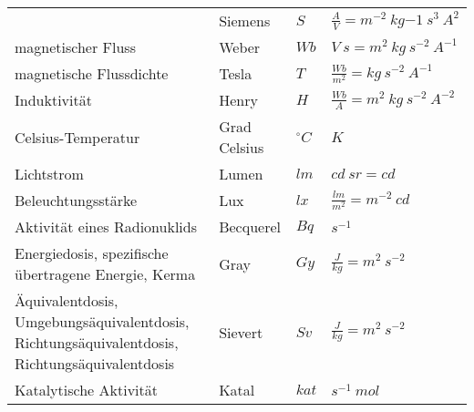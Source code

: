 \begin{footnotesize}
\begin{longtable}{p{}lll}
                    & Siemens
                    & $S$
                    & $\frac{A}{V} = m^{-2}~kg{-1}~s^3~A^2$ \\
  \rowcolor{lgray}  magnetischer Fluss
                    & Weber
                    & $Wb$
                    & $V~s = m^2~kg~s^{-2}~A^{-1}$ \\
  \rowcolor{white}  magnetische Flussdichte
                    & Tesla
                    & $T$
                    & $\frac{Wb}{m^2} = kg~s^{-2}~A^{-1}$ \\
  \rowcolor{lgray}  Induktivität
                    & Henry
                    & $H$
                    & $\frac{Wb}{A} = m^2~kg~s^{-2}~A^{-2}$ \\
  \rowcolor{white}  Celsius-Temperatur
                    & Grad Celsius
                    & $^{\circ} C$
                    & $K$ \\
  \rowcolor{lgray}  Lichtstrom
                    & Lumen
                    & $lm$
                    & $cd~sr = cd$ \\
  \rowcolor{white}  Beleuchtungsstärke
                    & Lux
                    & $lx$
                    & $\frac{lm}{m^2} = m^{-2}~cd$ \\
  \rowcolor{lgray}  Aktivität eines Radionuklids
                    & Becquerel
                    & $Bq$
                    & $s^{-1}$ \\
  \rowcolor{white}  Energiedosis, spezifische übertragene Energie, Kerma
                    & Gray
                    & $Gy$
                    & $\frac{J}{kg} = m^2~s^{-2}$ \\
  \rowcolor{lgray}  Äquivalentdosis, Umgebungsäquivalentdosis, 
                    Richtungsäquivalentdosis, Richtungsäquivalentdosis
                    & Sievert
                    & $Sv$
                    & $\frac{J}{kg} = m^2~s^{-2}$ \\
  \rowcolor{white}  Katalytische Aktivität
                    & Katal
                    & $kat$
                    & $s^{-1}~mol$ \\
\end{longtable}
\end{footnotesize}

